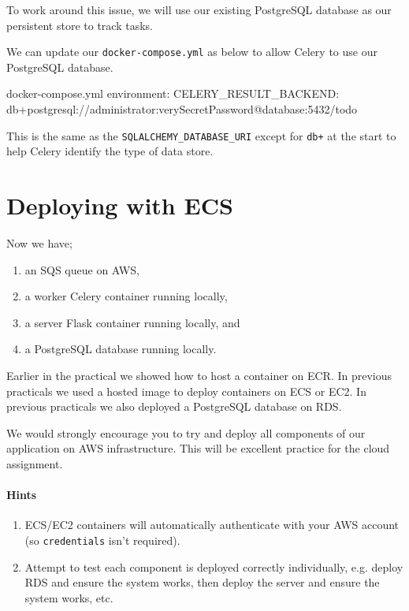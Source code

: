 \documentclass{csse4400}
\begin{document}
To work around this issue,
we will use our existing PostgreSQL database as our persistent store to track tasks.

We can update our \texttt{docker-compose.yml} as below to allow Celery to use our PostgreSQL database.

\begin{code}[numbers=none]{docker-compose.yml}
environment:
    CELERY_RESULT_BACKEND: db+postgresql://administrator:verySecretPassword@database:5432/todo
\end{code}

This is the same as the \texttt{SQLALCHEMY\_DATABASE\_URI} except for \texttt{db+} at the start to help Celery identify the type of data store.

\section{Deploying with ECS}

Now we have;
\begin{enumerate}
    \item an SQS queue on AWS,
    \item a worker Celery container running locally,
    \item a server Flask container running locally, and
    \item a PostgreSQL database running locally.
\end{enumerate}

Earlier in the practical we showed how to host a container on ECR.
In previous practicals we used a hosted image to deploy containers on ECS or EC2.
In previous practicals we also deployed a PostgreSQL database on RDS.

We would strongly encourage you to try and deploy all components of our application on AWS infrastructure.
This will be excellent practice for the cloud assignment.

\paragraph{Hints}
\begin{enumerate}
    \item ECS/EC2 containers will automatically authenticate with your AWS account (so \texttt{credentials} isn't required).
    \item Attempt to test each component is deployed correctly individually, e.g. deploy RDS and ensure the system works, then deploy the server and ensure the system works, etc.
\end{enumerate}



\end{document}
